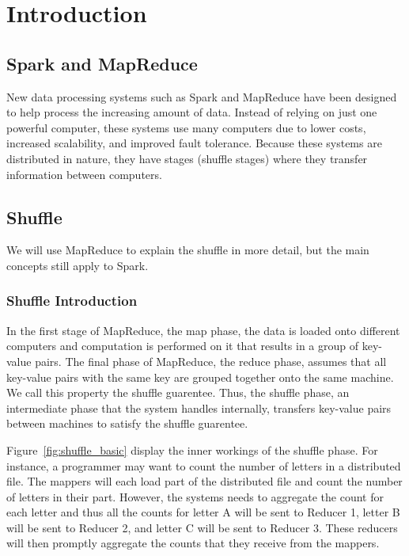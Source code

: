 \chapter{Introduction}\label{intro-ch}

\section{Spark and MapReduce}


New data processing systems such as Spark and MapReduce have been designed to help process the increasing amount of data. 
Instead of relying on just one powerful computer, these systems use many computers due to lower costs, increased scalability, and improved fault tolerance. 
Because these systems are distributed in nature, they have stages (shuffle stages) where they transfer information between computers. 
\section{Shuffle} 

We will use MapReduce to explain the shuffle in more detail, but the main concepts still apply to Spark.

\subsection{Shuffle Introduction}
In the first stage of MapReduce, the map phase, the data is loaded onto different computers and computation is performed on it that results 
in a group of key-value pairs. The final phase of MapReduce, the reduce phase, assumes that all key-value pairs with the same
key are grouped together onto the same machine. We call this property the shuffle guarentee. Thus, the shuffle phase, an intermediate phase that the system handles internally, transfers key-value pairs between machines to satisfy the shuffle guarentee. 


Figure~\ref{fig:shuffle_basic} display the inner workings 
of the shuffle phase. For instance, a programmer may  want to count the 
number of letters in a distributed file. The mappers will each load part of the distributed file and count the number of
letters in their part. However, the systems needs to aggregate the count for each letter and 
thus all the counts for letter A will be sent to Reducer 1, letter B will be sent to Reducer 2,
and letter C will be sent to Reducer 3. These reducers will then promptly aggregate the counts that they receive from the 
mappers.

